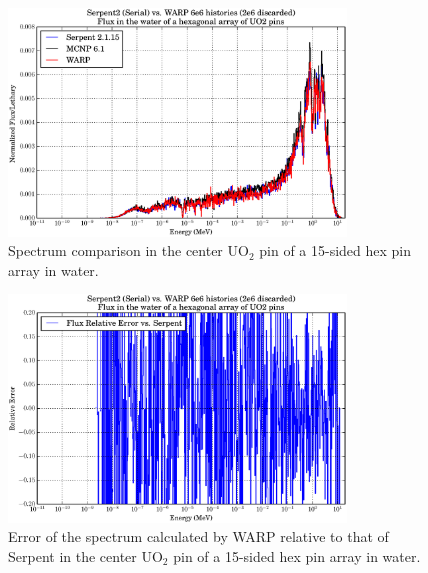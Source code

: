 \begin{figure}[h!] 
\centering
\includegraphics[width=0.8\textwidth]{graphics/finalresults/assembly_spec.eps}
\caption{Spectrum comparison in the center UO$_2$ pin of a 15-sided hex pin array in water. \label{assembly_spec} }
\end{figure}

\begin{figure}[h!] 
\centering
\includegraphics[width=0.8\textwidth]{graphics/finalresults/assembly_spec_err.eps}
\caption{Error of the spectrum calculated by WARP relative to that of Serpent in the center UO$_2$ pin of a 15-sided hex pin array in water. \label{assembly_spec_err} }
\end{figure}

